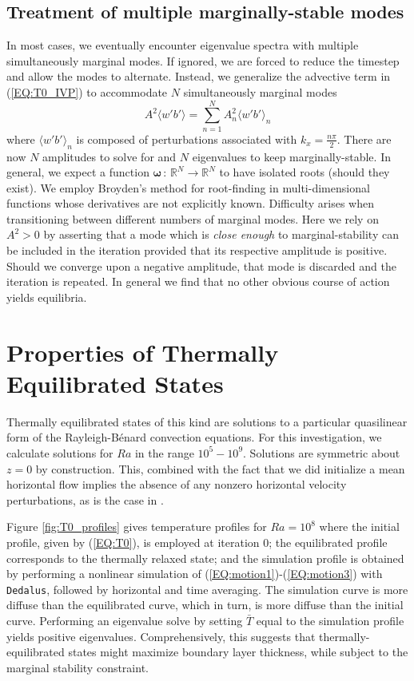 \documentclass[reprint,amsmath,amssymb,aps]{revtex4-1}
\begin{document}
\subsection{Treatment of multiple marginally-stable modes} \label{sec:multiple_modes}
In most cases, we eventually encounter eigenvalue spectra with multiple simultaneously marginal modes. If ignored, we are forced to reduce the timestep and allow the modes to alternate. Instead, we generalize the advective term in (\ref{EQ:T0_IVP}) to accommodate $N$ simultaneously marginal modes
\begin{equation}
    A^2 \langle w' b' \rangle = \sum_{n = 1}^{N} A^2_{n} \langle w' b' \rangle_{n}
\end{equation}
where  $\langle w' b' \rangle_{n}$ is composed of perturbations associated with $k_x = \frac{n\pi}{2}$. 
There are now $N$ amplitudes to solve for and $N$ eigenvalues to keep marginally-stable. 
In general, we expect a function $\mathbf{\omega} \, : \, \mathbb{R}^N \to  \mathbb{R}^N$ to have isolated roots (should they exist). 
We employ Broyden's method for root-finding in multi-dimensional functions whose derivatives are not explicitly known. 
Difficulty arises when transitioning between different numbers of marginal modes. 
Here we rely on $A^2 > 0$ by asserting that a mode which is \textit{close enough} to marginal-stability can be included in the iteration provided that its respective amplitude is positive. 
Should we converge upon a negative amplitude, that mode is discarded and the iteration is repeated. 
In general we find that no other obvious course of action yields equilibria.

\section{Properties of Thermally Equilibrated States}\label{sec:properties}
Thermally equilibrated states of this kind are solutions to a particular quasilinear form of the Rayleigh-B\'enard convection equations. 
For this investigation, we calculate solutions for $Ra$ in the range $10^5 - 10^9$. 
Solutions are symmetric about $z = 0$ by construction. 
This, combined with the fact that we did initialize a mean horizontal flow implies the absence of any nonzero horizontal velocity perturbations, as is the case in \cite{Waleffe}. 

Figure \ref{fig:T0_profiles} gives temperature profiles for $Ra = 10^8$ where the initial profile, given by (\ref{EQ:T0}), is employed at iteration 0; the equilibrated profile corresponds to the thermally relaxed state; and the simulation profile is obtained by performing a nonlinear simulation of (\ref{EQ:motion1})-(\ref{EQ:motion3}) with \texttt{Dedalus}, followed by horizontal and time averaging. 
The simulation curve is more diffuse than the equilibrated curve, which in turn, is more diffuse than the initial curve. 
Performing an eigenvalue solve by setting $\bar{T}$ equal to the simulation profile yields positive eigenvalues. 
Comprehensively, this suggests that thermally-equilibrated states might maximize boundary layer thickness, while subject to the marginal stability constraint.
\end{document}
